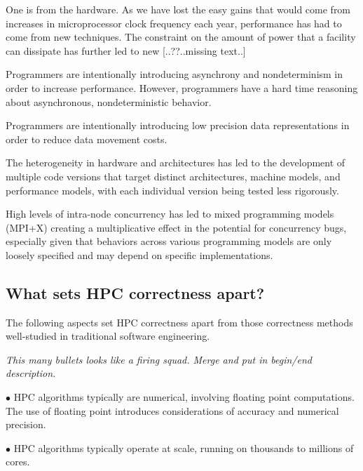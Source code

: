 \begin{compactitem}
\item One is from the hardware.  As we have lost the easy gains that would come from increases in microprocessor clock frequency each year, performance has had to come from new techniques. The constraint on the amount of power that a facility can dissipate has further led to new [..??..missing text..]

\item Programmers are intentionally introducing asynchrony and nondeterminism in order to increase performance.  However, programmers have a hard time reasoning about asynchronous, nondeterministic behavior.

\item Programmers are intentionally introducing low precision data representations in order to reduce data movement costs.

\item The heterogeneity in hardware and architectures has led to the development of multiple code versions that target distinct architectures, machine models, and performance models, with each individual version being tested less rigorously.

\item High levels of intra-node concurrency has led to mixed programming models (MPI+X) creating a multiplicative effect in the potential for concurrency bugs, especially given that 
behaviors across various programming models are only loosely specified and may depend on
specific implementations.

\end{compactitem}



\subsection{What sets HPC correctness apart?} 

The following aspects set HPC correctness apart from those correctness methods well-studied in traditional software engineering.

{\small\em This many bullets looks like a firing squad. Merge and put in begin/end description.}

$\bullet$
HPC algorithms typically are numerical, involving floating point computations.  The use of floating point introduces considerations of accuracy and numerical precision.  
   
$\bullet$ HPC algorithms typically operate at scale, running on thousands to millions of cores.

